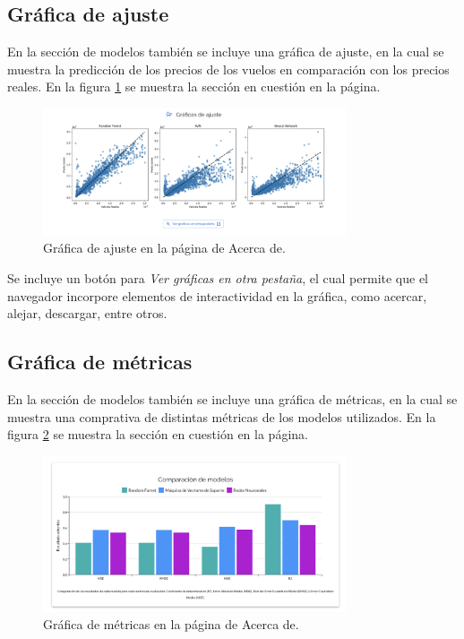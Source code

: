 \subsection{Gráfica de ajuste}
En la sección de modelos también se incluye una gráfica de ajuste, en la cual se
muestra la predicción de los precios de los vuelos en comparación con los precios
reales. En la figura \ref{fig:ajuste} se muestra la sección en cuestión en la
página.

\begin{figure}[H]
  \centering
  \includegraphics[width=0.8\textwidth]{imagenes/04-acerca-de/graficas-ajuste.png}
  \caption{Gráfica de ajuste en la página de Acerca de.}
  \label{fig:ajuste}
\end{figure}

Se incluye un botón para \textit{Ver gráficas en otra pestaña}, el cual permite
que el navegador incorpore elementos de interactividad en la gráfica, como
acercar, alejar, descargar, entre otros.

\subsection{Gráfica de métricas}
En la sección de modelos también se incluye una gráfica de métricas, en la cual
se muestra una comprativa de distintas métricas de los modelos utilizados. En la
figura \ref{fig:metricas} se muestra la sección en cuestión en la página.

\begin{figure}[H]
  \centering
  \includegraphics[width=0.8\textwidth]{imagenes/04-acerca-de/graficas-metricas.png}
  \caption{Gráfica de métricas en la página de Acerca de.}
  \label{fig:metricas}
\end{figure}

